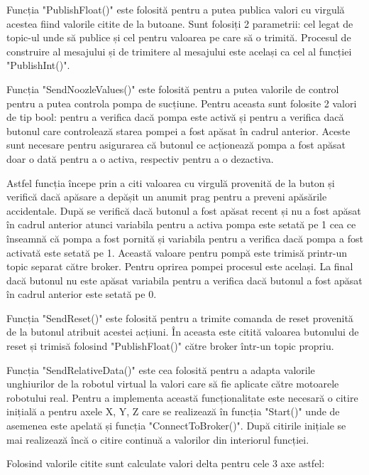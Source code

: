  Funcția  "PublishFloat()" este folosită pentru a putea publica valori cu virgulă acestea fiind valorile citite de la butoane. Sunt folosiți 2 parametrii: cel legat de topic-ul unde să publice și cel pentru valoarea pe care să o trimită. Procesul de construire al mesajului și de trimitere al mesajului este același ca cel al funcției "PublishInt()".
 
 
 Funcția "SendNoozleValues()" este folosită pentru a putea valorile de control pentru a putea controla pompa de sucțiune. Pentru aceasta sunt folosite 2 valori de tip bool: pentru a verifica dacă pompa este activă și pentru a verifica dacă butonul care controlează starea pompei a fost apăsat în cadrul anterior. Aceste sunt necesare pentru asigurarea că butonul ce acționează pompa a fost apăsat doar o dată pentru a o activa, respectiv pentru a o dezactiva. 
 
 Astfel funcția începe prin a citi valoarea cu virgulă provenită de la buton și verifică dacă apăsare a depășit un anumit prag pentru a preveni apăsările accidentale. După se verifică dacă butonul a fost apăsat recent și nu a fost apăsat în cadrul anterior atunci variabila pentru a activa pompa este setată pe 1 cea ce înseamnă că pompa a fost pornită și variabila pentru a verifica dacă pompa a fost activată este setată pe 1.  Această valoare pentru pompă este trimisă printr-un topic separat către broker. Pentru oprirea pompei procesul este același. La final dacă butonul nu este apăsat variabila pentru a verifica dacă butonul a fost apăsat în cadrul anterior este setată pe 0.

Funcția "SendReset()" este folosită pentru a trimite comanda de reset provenită de la butonul atribuit acestei acțiuni. În aceasta este citită valoarea butonului de reset și trimisă folosind "PublishFloat()" către broker într-un topic propriu.

Funcția "SendRelativeData()" este cea folosită pentru a adapta valorile unghiurilor de la robotul virtual la valori care să fie aplicate către motoarele robotului real. Pentru a implementa această funcționalitate este necesară o citire inițială a pentru axele X, Y, Z care se realizează în funcția "Start()" unde de asemenea este apelată și funcția "ConnectToBroker()". După citirile inițiale se mai realizează încă o citire continuă a valorilor din interiorul funcției. 

Folosind valorile citite  sunt calculate valori delta pentru cele 3 axe astfel:

